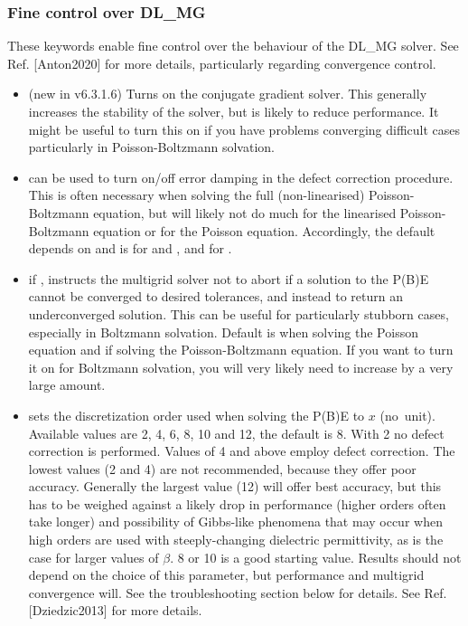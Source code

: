 \documentclass[letterpaper,10pt,english]{sphinxmanual}
\begin{document}
\subsubsection{Fine control over DL\_MG}
\label{\detokenize{implicit_solvation_v3:fine-control-over-dl-mg}}
These keywords enable fine control over the behaviour of the DL\_MG
solver. See Ref. {[}Anton2020{]} for more details, particularly regarding convergence
control.
\begin{itemize}
\item {} 
 (new in v6.3.1.6) Turns on the conjugate gradient
solver. This generally increases the stability of the solver, but is
likely to reduce performance. It might be useful to turn this on if
you have problems converging difficult cases \textendash{} particularly in
Poisson-Boltzmann solvation.

\item {} 
 can be used to turn on/off error damping
in the defect correction procedure. This is often necessary when
solving the full (non-linearised) Poisson-Boltzmann equation, but
will likely not do much for the linearised Poisson-Boltzmann equation
or for the Poisson equation. Accordingly, the default depends on
 and is  for  and
, and  for .

\item {} 
 if , instructs the multigrid solver
not to abort if a solution to the P(B)E cannot be converged to
desired tolerances, and instead to return an underconverged solution.
This can be useful for particularly stubborn cases, especially in
Boltzmann solvation. Default is  when solving the Poisson
equation and  if solving the Poisson-Boltzmann equation. If you
want to turn it on for Boltzmann solvation, you will very likely need
to increase  by a very large amount.

\item {} 
 sets the discretization order used when
solving the P(B)E to \(x\) (no unit). Available values are 2, 4,
6, 8, 10 and 12, the default is 8. With 2 no defect correction is
performed. Values of 4 and above employ defect correction. The lowest
values (2 and 4) are not recommended, because they offer poor
accuracy. Generally the largest value (12) will offer best accuracy,
but this has to be weighed against a likely drop in performance
(higher orders often take longer) and possibility of Gibbs-like
phenomena that may occur when high orders are used with
steeply-changing dielectric permittivity, as is the case for larger
values of \(\beta\). 8 or 10 is a good starting value. Results
should not depend on the choice of this parameter, but performance
and multigrid convergence will. See the troubleshooting section below
for details. See Ref. {[}Dziedzic2013{]} for more details.


\end{itemize}
\end{document}
